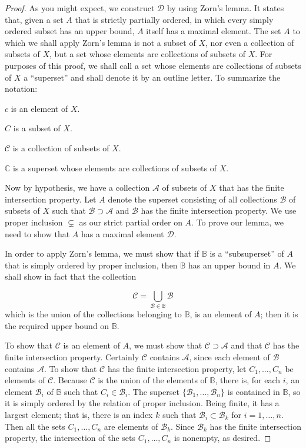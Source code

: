 \begin{proof}
 As you might expect, we construct \(\mathcal{D}\) by using Zorn's lemma. It states that, given a set \(A\) that is strictly partially ordered, in which every simply ordered subset has an upper bound, \(A\) itself has a maximal element.
The set \(A\) to which we shall apply Zorn's lemma is not a subset of \(X\), nor even a collection of subsets of \(X\), but a set whose elements are collections of subsets of \(X\). For purposes of this proof, we shall call a set whose elements are collections of subsets of \(X\) a ``superset'' and shall denote it by an outline letter. To summarize the notation:

\(c\) is an element of \(X\).

\(C\) is a subset of \(X\).

\(\mathcal{C}\) is a collection of subsets of \(X\).

\(\mathbb{C}\) is a superset whose elements are collections of subsets of \(X\).

Now by hypothesis, we have a collection \(\mathcal{A}\) of subsets of \(X\) that has the finite intersection property. Let \(A\) denote the superset consisting of all collections \(\mathcal{B}\) of subsets of \(X\) such that \(\mathcal{B} \supset \mathcal{A}\) and \(\mathcal{B}\) has the finite intersection property. We use proper inclusion \(\subsetneq\) as our strict partial order on \(A\). To prove our lemma, we need to show that \(A\) has a maximal element \(\mathcal{D}\).

In order to apply Zorn's lemma, we must show that if \(\mathbb{B}\) is a ``subsuperset'' of \(A\) that is simply ordered by proper inclusion, then \(\mathbb{B}\) has an upper bound in \(A\). We shall show in fact that the collection

\[
\mathcal{C} = \mathop{\bigcup }\limits_{{\mathcal{B} \in \mathbb{B}}}\mathcal{B}
\]
which is the union of the collections belonging to \(\mathbb{B}\), is an element of \(A\); then it is the required upper bound on \(\mathbb{B}\).

To show that \(\mathcal{C}\) is an element of \(A\), we must show that \(\mathcal{C} \supset \mathcal{A}\) and that \(\mathcal{C}\) has the finite intersection property. Certainly \(\mathcal{C}\) contains \(\mathcal{A}\), since each element of \(\mathcal{B}\) contains \(\mathcal{A}\). To show that \(\mathcal{C}\) has the finite intersection property, let \(C_{1},\ldots ,C_{n}\) be elements of \(\mathcal{C}\). Because \(\mathcal{C}\) is the union of the elements of \(\mathbb{B}\), there is, for each \(i\), an element \(\mathcal{B}_{i}\) of \(\mathbb{B}\) such that \(C_{i} \in {\mathcal{B}}_{i}\). The superset \(\{ {\mathcal{B}_{1},\ldots ,\mathcal{B}_{n}}\}\) is contained in \(\mathbb{B}\), so it is simply ordered by the relation of proper inclusion. Being finite, it has a largest element; that is, there is an index \(k\) such that \(\mathcal{B}_{i} \subset {\mathcal{B}}_{k}\) for \(i = 1,\ldots, n\). Then all the sets \(C_{1},\ldots ,C_{n}\) are elements of \(\mathcal{B}_{k}\). Since \(\mathcal{B}_{k}\) has the finite intersection property, the intersection of the sets \(C_{1},\ldots ,C_{n}\) is nonempty, as desired.
\end{proof}
